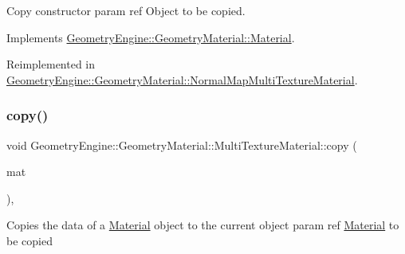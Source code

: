 Copy constructor param ref Object to be copied. 

Implements \mbox{\hyperlink{class_geometry_engine_1_1_geometry_material_1_1_material_ae5513ff06d536365e18ddc5e07e79784}{Geometry\+Engine\+::\+Geometry\+Material\+::\+Material}}.



Reimplemented in \mbox{\hyperlink{class_geometry_engine_1_1_geometry_material_1_1_normal_map_multi_texture_material_a38df455f7369f68ea2fc6abf31488c40}{Geometry\+Engine\+::\+Geometry\+Material\+::\+Normal\+Map\+Multi\+Texture\+Material}}.

\mbox{\label{class_geometry_engine_1_1_geometry_material_1_1_multi_texture_material_add208366ae882ad1bd9c6029969902b4}} 
\subsubsection{\texorpdfstring{copy()}{copy()}}
{\footnotesize\ttfamily void Geometry\+Engine\+::\+Geometry\+Material\+::\+Multi\+Texture\+Material\+::copy (\begin{DoxyParamCaption}\item[{const \mbox{\hyperlink{class_geometry_engine_1_1_geometry_material_1_1_multi_texture_material}{Multi\+Texture\+Material}} \&}]{mat }\end{DoxyParamCaption})\hspace{0.3cm}{\ttfamily [protected]}, {\ttfamily [virtual]}}

Copies the data of a \mbox{\hyperlink{class_geometry_engine_1_1_geometry_material_1_1_material}{Material}} object to the current object param ref \mbox{\hyperlink{class_geometry_engine_1_1_geometry_material_1_1_material}{Material}} to be copied \mbox{\label{class_geometry_engine_1_1_geometry_material_1_1_multi_texture_material_af6edaa5960d07b6abee870760e869189}} 
